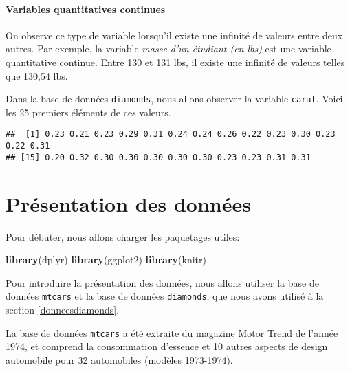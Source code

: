 \documentclass[]{book}
\newenvironment{Shaded}{\begin{snugshade}}{\end{snugshade}}
\newcommand{\KeywordTok}[1]{\textcolor[rgb]{0.13,0.29,0.53}{\textbf{#1}}}
\newcommand{\DecValTok}[1]{\textcolor[rgb]{0.00,0.00,0.81}{#1}}
\newcommand{\OperatorTok}[1]{\textcolor[rgb]{0.81,0.36,0.00}{\textbf{#1}}}
\newcommand{\NormalTok}[1]{#1}
\begin{document}
\subsubsection{Variables quantitatives
continues}\label{variables-quantitatives-continues}

On observe ce type de variable lorsqu'il existe une infinité de valeurs
entre deux autres. Par exemple, la variable \emph{masse d'un étudiant
(en lbs)} est une variable quantitative continue. Entre 130 et 131 lbs,
il existe une infinité de valeurs telles que 130,54 lbs.

Dans la base de données \texttt{diamonds}, nous allons observer la
variable \texttt{carat}. Voici les 25 premiers éléments de ces valeurs.

\begin{Shaded}
\end{Shaded}

\begin{verbatim}
##  [1] 0.23 0.21 0.23 0.29 0.31 0.24 0.24 0.26 0.22 0.23 0.30 0.23 0.22 0.31
## [15] 0.20 0.32 0.30 0.30 0.30 0.30 0.30 0.23 0.23 0.31 0.31
\end{verbatim}

\chapter{Présentation des données}\label{presentation-des-donnees}

Pour débuter, nous allons charger les paquetages utiles:

\begin{Shaded}
\begin{Highlighting}[]
\KeywordTok{library}\NormalTok{(dplyr)}
\KeywordTok{library}\NormalTok{(ggplot2)}
\KeywordTok{library}\NormalTok{(knitr)}
\end{Highlighting}
\end{Shaded}

Pour introduire la présentation des données, nous allons utiliser la
base de données \texttt{mtcars} et la base de données \texttt{diamonds},
que nous avons utilisé à la section \ref{donneesdiamonds}.

La base de données \texttt{mtcars} a été extraite du magazine Motor
Trend de l'année 1974, et comprend la consommation d'essence et 10
autres aspects de design automobile pour 32 automobiles (modèles
1973-1974).
\end{document}
